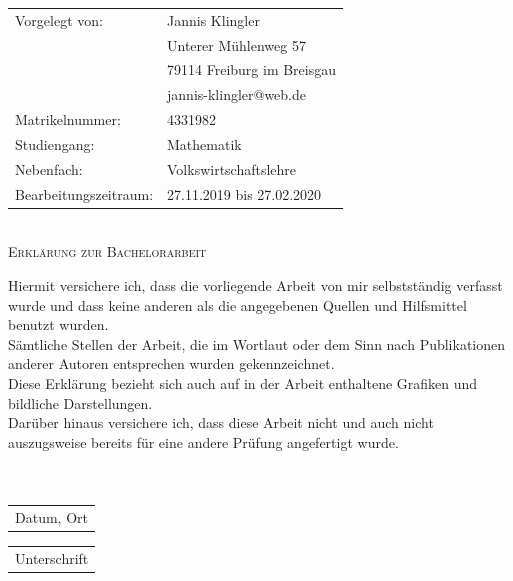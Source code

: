 \documentclass[11pt,titlepage]{article}
\theoremstyle{definition}
\theoremstyle{remark}
\begin{document}
	\thispagestyle{empty}
	\vspace*{17cm}
	\begin{tabular}{ll}
		Vorgelegt von: & Jannis Klingler \\
		& Unterer Mühlenweg 57\\
		& 79114 Freiburg im Breisgau
		\\
		& jannis-klingler@web.de\\
		Matrikelnummer: & {4331982} \\
		Studiengang: & {Mathematik}\\
		Nebenfach: & {Volkswirtschaftslehre}\\
		Bearbeitungszeitraum: & {27.11.2019 bis 27.02.2020} \\
	\end{tabular}\\
	
	\thispagestyle{empty}
		\vspace*{1cm}
		\LARGE\textsc{Erklärung zur Bachelorarbeit}
		
		\vspace{1.5cm}
		
		\normalsize 
		Hiermit versichere ich, dass die vorliegende Arbeit von mir selbstständig verfasst wurde und dass keine anderen als die angegebenen Quellen und Hilfsmittel benutzt wurden.\\ Sämtliche Stellen der Arbeit, die im Wortlaut oder dem Sinn nach Publikationen anderer Autoren entsprechen wurden gekennzeichnet.\\
		Diese Erklärung bezieht sich auch auf in der Arbeit enthaltene Grafiken und bildliche Darstellungen.\\
		Darüber hinaus versichere ich, dass diese Arbeit nicht und auch nicht auszugsweise bereits für eine andere Prüfung angefertigt wurde. 
		\ \\
		\ \\
		\ \\
		\begin{minipage}{0.57\textwidth}
			\begin{tabular}{@{}l@{}}\hline
				Datum, Ort \hspace{4.2cm}
			\end{tabular}
		\end{minipage}
		\hfill
		\begin{minipage}{0.43\textwidth} 
			\begin{tabular}{@{}l@{}}\hline
				Unterschrift \hspace{4.2cm}
			\end{tabular}
		\end{minipage}
		
\end{document}

